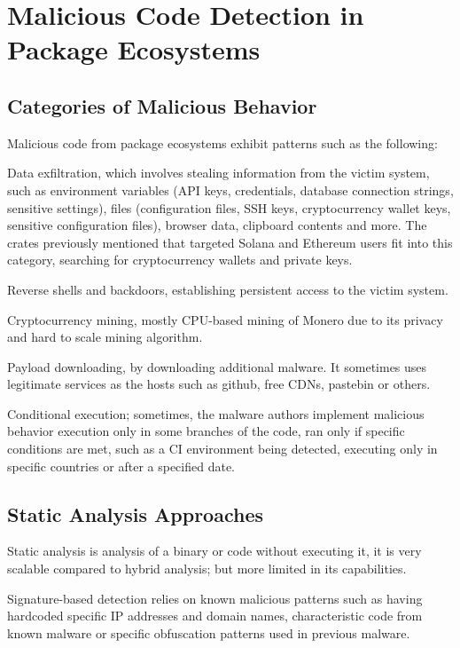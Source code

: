 \section{Malicious Code Detection in Package Ecosystems}\label{sect:malicious-code-detection}

\subsection{Categories of Malicious Behavior}\label{sect:malicious-code-categories}

Malicious code from package ecosystems exhibit patterns such as the following:

Data exfiltration, which involves stealing information from the victim system, such as environment variables (API keys, credentials, database connection strings, sensitive settings), files (configuration files, SSH keys, cryptocurrency wallet keys, sensitive configuration files), browser data, clipboard contents and more. The crates previously mentioned that targeted Solana and Ethereum users fit into this category, searching for cryptocurrency wallets and private keys.

Reverse shells and backdoors, establishing persistent access to the victim system.

Cryptocurrency mining, mostly CPU-based mining of Monero due to its privacy and hard to scale mining algorithm.

Payload downloading, by downloading additional malware. It sometimes uses legitimate services as the hosts such as github, free CDNs, pastebin or others.

Conditional execution; sometimes, the malware authors implement malicious behavior execution only in some branches of the code, ran only if specific conditions are met, such as a CI environment being detected, executing only in specific countries or after a specified date.

\subsection{Static Analysis Approaches}\label{sect:static-analysis}

Static analysis is analysis of a binary or code without executing it, it is very scalable compared to hybrid analysis; but more limited in its capabilities.

Signature-based detection relies on known malicious patterns such as having hardcoded specific IP addresses and domain names, characteristic code from known malware or specific obfuscation patterns used in previous malware.

